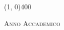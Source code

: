 \begin{titlepage}
\begin{center}
\vspace{10pt}

\vspace{0pt}

\line(1, 0){400} \\
\begin{normalsize}
\textsc{Anno Accademico \myAA}
\end{normalsize}

\end{center}
\end{titlepage} 